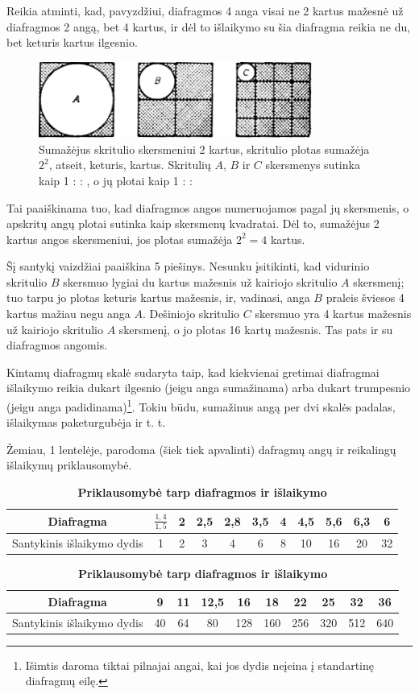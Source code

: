 \documentclass[12pt]{book}
\begin{document}
					Reikia atminti, kad, pavyzdžiui, diafragmos 4 anga visai ne 2 kartus mažesnė už diafragmos 2 angą, bet 4 kartus, ir dėl to išlaikymo su šia diafragma reikia ne du, bet keturis kartus ilgesnio.
					\begin{figure}[h]
						\centering
						\includegraphics[width=0.8\textwidth]{5-pav}
						\caption{Sumažėjus skritulio skersmeniui 2 kartus, skritulio plotas sumažėja $2^{2}$, atseit, keturis, kartus. Skritulių $A$, $B$ ir $C$ skersmenys sutinka kaip 1 :  : , o jų plotai kaip 1 :  : }
						\label{fig:5}
					\end{figure}
					Tai paaiškinama tuo, kad diafragmos angos numeruojamos pagal jų skersmenis, o apskritų angų plotai sutinka kaip skersmenų kvadratai. Dėl to, sumažėjus 2 kartus angos skersmeniui, jos plotas sumažėja $2^{2} = 4$ kartus.

					Šį santykį vaizdžiai paaiškina 5 piešinys. Nesunku įsitikinti, kad vidurinio skritulio $B$ skersmuo lygiai du kartus mažesnis už kairiojo skritulio $A$ skersmenį; tuo tarpu jo plotas keturis kartus mažesnis, ir, vadinasi, anga $B$ praleis šviesos 4 kartus mažiau negu anga $A$. Dešiniojo skritulio $C$ skersmuo yra 4 kartus mažesnis už kairiojo skritulio $A$ skersmenį, o jo plotas 16 kartų mažesnis. Tas pats ir su diafragmos angomis.

					Kintamų diafragmų skalė sudaryta taip, kad kiekvienai gretimai diafragmai išlaikymo reikia dukart ilgesnio (jeigu anga sumažinama) arba dukart trumpesnio (jeigu anga padidinama)\footnote{Išimtis daroma tiktai pilnajai angai, kai jos dydis neįeina į standartinę diafragmų eilę.}. Tokiu būdu, sumažinus angą per dvi skalės padalas, išlaikymas paketurgubėja ir t. t.

					Žemiau, 1 lentelėje, parodoma (šiek tiek apvalinti) dafragmų angų ir reikalingų išlaikymų priklausomybė.
					\begin{table}[h]
						\caption{\textbf{Priklausomybė tarp diafragmos ir išlaikymo}}
						\begin{tabular}{c|c|c|c|c|c|c|c|c|c|c|}
							\hline
							Diafragma & $\frac{1,4}{1,5}$ & 2 & 2,5 & 2,8 & 3,5 & 4 & 4,5 & 5,6 & 6,3 & 6 \\ \hline
							Santykinis išlaikymo dydis & 1 & 2 & 3 & 4 & 6 & 8 & 10 & 16 & 20 & 32 \\
							\hline
						\end{tabular}
						\begin{tabular}{c|c|c|c|c|c|c|c|c|c|}
							\hline
							Diafragma & 9 & 11 & 12,5 & 16 & 18 & 22 & 25 & 32 & 36 \\ \hline
							Santykinis išlaikymo dydis & 40 & 64 & 80 & 128 & 160 & 256 & 320 & 512 & 640 \\
							\hline
						\end{tabular}
					\end{table}
\end{document}
